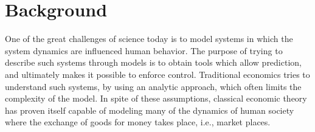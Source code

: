 \section{Background}
One of the great challenges of science today is to model systems in which the system dynamics are influenced  human behavior. The purpose of trying to describe such systems through models is to obtain tools which allow prediction, and ultimately makes it possible to enforce control. Traditional economics tries to understand such systems, by using an analytic approach, which often limits the complexity of the model. In spite of these assumptions, classical economic theory has proven itself capable of modeling many of the dynamics of human society where the exchange of goods for money takes place, i.e., market places. 

